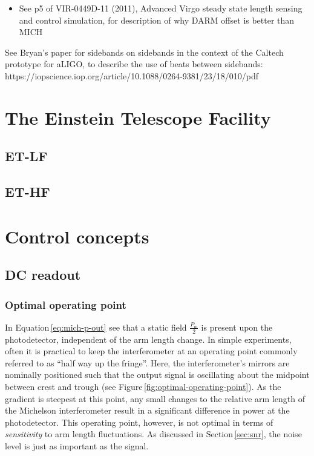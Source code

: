 \begin{itemize}
  \item See p5 of VIR-0449D-11 (2011), Advanced Virgo steady state length sensing and control simulation, for description of why DARM offset is better than MICH
\end{itemize}
  
See Bryan's paper for sidebands on sidebands in the context of the Caltech prototype for aLIGO, to describe the use of beats between sidebands: https://iopscience.iop.org/article/10.1088/0264-9381/23/18/010/pdf

\section{The Einstein Telescope Facility}

\subsection{ET-LF}

\subsection{ET-HF}

\section{Control concepts}
\subsection{DC readout}
\subsubsection{Optimal operating point}
In Equation\,\ref{eq:mich-p-out} see that a static field $\frac{P_{\text{in}}}{2}$ is present upon the photodetector, independent of the arm length change. In simple experiments, often it is practical to keep the interferometer at an operating point commonly referred to as ``half way up the fringe''. Here, the interferometer's mirrors are nominally positioned such that the output signal is oscillating about the midpoint between crest and trough (see Figure\,\ref{fig:optimal-operating-point}). As the gradient is steepest at this point, any small changes to the relative arm length of the Michelson interferometer result in a significant difference in power at the photodetector. This operating point, however, is not optimal in terms of \emph{sensitivity} to arm length fluctuations. As discussed in Section\,\ref{sec:snr}, the noise level is just as important as the signal.

